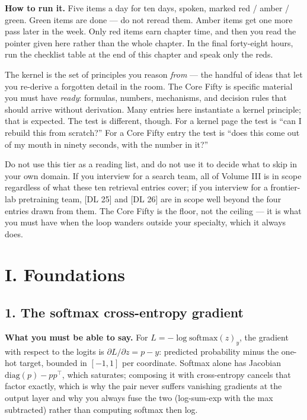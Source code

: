 \textbf{How to run it.} Five items a day for ten days, spoken, marked red / amber / green. Green items are done --- do not reread them. Amber items get one more pass later in the week. Only red items earn chapter time, and then you read the pointer given here rather than the whole chapter. In the final forty-eight hours, run the checklist table at the end of this chapter and speak only the reds.

\begin{keyinsight}
The kernel is the set of principles you reason \emph{from} --- the handful of ideas that let you re-derive a forgotten detail in the room. The Core Fifty is specific material you must have \emph{ready}: formulas, numbers, mechanisms, and decision rules that should arrive without derivation. Many entries here instantiate a kernel principle; that is expected. The test is different, though. For a kernel page the test is ``can I rebuild this from scratch?'' For a Core Fifty entry the test is ``does this come out of my mouth in ninety seconds, with the number in it?''
\end{keyinsight}

\begin{warningbox}
Do not use this tier as a reading list, and do not use it to decide what to skip in your own domain. If you interview for a search team, all of Volume III is in scope regardless of what these ten retrieval entries cover; if you interview for a frontier-lab pretraining team, [DL 25] and [DL 26] are in scope well beyond the four entries drawn from them. The Core Fifty is the floor, not the ceiling --- it is what you must have when the loop wanders outside your specialty, which it always does.
\end{warningbox}

\section*{I. Foundations}

\subsection*{1. The softmax cross-entropy gradient}

\textbf{What you must be able to say.} For $L = -\log \mathrm{softmax}(z)_y$, the gradient with respect to the logits is $\partial L / \partial z = p - y$: predicted probability minus the one-hot target, bounded in $[-1, 1]$ per coordinate. Softmax alone has Jacobian $\mathrm{diag}(p) - pp^{\top}$, which saturates; composing it with cross-entropy cancels that factor exactly, which is why the pair never suffers vanishing gradients at the output layer and why you always fuse the two (log-sum-exp with the max subtracted) rather than computing softmax then log.

